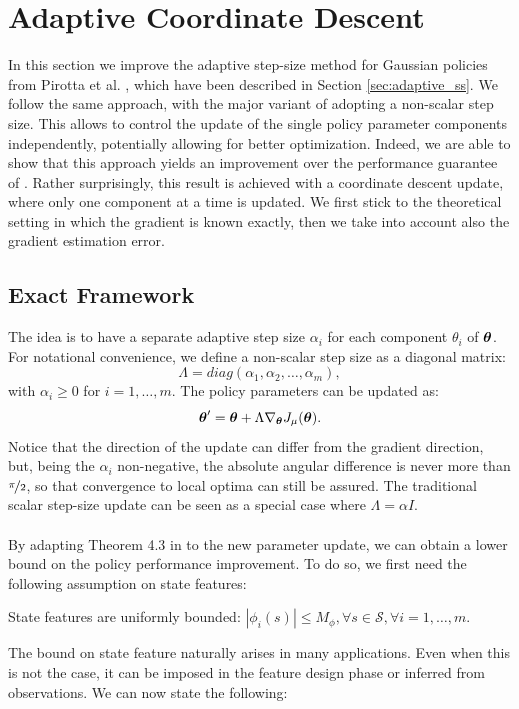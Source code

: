 \section{Adaptive Coordinate Descent}\label{sec:acd}
In this section we improve the adaptive step-size method for Gaussian policies from Pirotta et al. \cite{NIPS2013_5186}, which have been described in Section \ref{sec:adaptive_ss}. We follow the same approach, with the major variant of adopting a non-scalar step size. This allows to control the update of the single policy parameter components independently, potentially allowing for better optimization. Indeed, we are able to show that this approach yields an improvement over the performance guarantee of \cite{NIPS2013_5186}. Rather surprisingly, this result is achieved with a coordinate descent update, where only one component at a time is updated. 
We first stick to the theoretical setting in which the gradient is known exactly, then we take into account also the gradient estimation error.


\subsection{Exact Framework}
The idea is to have a separate adaptive step size $\alpha_i$ for each component $\theta_i$ of $\boldsymbol{\theta}$. For notational convenience, we define a non-scalar step size as a diagonal matrix:
\[
\Lambda=diag(\alpha_1, \alpha_2,\dotsc, \alpha_m),
\] 
with $\alpha_i \geq 0$ for $i=1,\dotsc,m$. The policy parameters can be updated as:
\[
\boldsymbol{\theta}'=\boldsymbol{\theta}+\Lambda\nabla_{\boldsymbol{\theta}}J_\mu(\boldsymbol{\theta}).
\]
Notice that the direction of the update can differ from the gradient direction, but, being the $\alpha_i$ non-negative, the absolute angular difference is never more than $\nicefrac{\pi}{2}$, so that convergence to local optima can still be assured.
The traditional scalar step-size update can be seen as a special case where $\Lambda = \alpha I$.
\paragraph{}
By adapting Theorem 4.3 in \cite{NIPS2013_5186} to the new parameter update, we can obtain a lower bound on the policy performance improvement. To do so, we first need the following assumption on state features:
\begin{assumption}\label{assum:1}
State features are uniformly bounded:
$|\phi_i(s)| \leq M_{\phi}, \forall s \in \mathcal{S}, \forall i=1,\dotsc,m$.
\end{assumption}
The bound on state feature naturally arises in many applications. Even when this is not the case, it can be imposed in the feature design phase or inferred from observations. 
We can now state the following:

